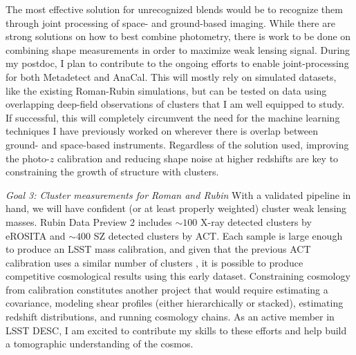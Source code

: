 \documentclass[11pt]{article}
\begin{document}
The most effective solution for unrecognized blends would be to recognize them through joint processing of space- and ground-based imaging.
While there are strong solutions on how to best combine photometry, there is work to be done on combining shape measurements in order to maximize weak lensing signal.
During my postdoc, I plan to contribute to the ongoing efforts to enable joint-processing for both Metadetect and AnaCal.
This will mostly rely on simulated datasets, like the existing Roman-Rubin simulations, but can be tested on data using overlapping deep-field observations of clusters that I am well equipped to study.
If successful, this will completely circumvent the need for the machine learning techniques I have previously worked on wherever there is overlap between ground- and space-based instruments.
Regardless of the solution used, improving the photo-$z$ calibration and reducing shape noise at higher redshifts are key to constraining the growth of structure with clusters.


\textit{Goal 3: Cluster measurements for Roman and Rubin}
With a validated pipeline in hand, we will have confident (or at least properly weighted) cluster weak lensing masses.
Rubin Data Preview 2 includes $\sim 100$ X-ray detected clusters by eROSITA and $\sim 400$ SZ detected clusters by ACT.
Each sample is large enough to produce an LSST mass calibration, and given that the previous ACT calibration uses a similar number of clusters \cite{act_tae}, it is possible to produce competitive cosmological results using this early dataset.
Constraining cosmology from calibration constitutes another project that would require estimating a covariance, modeling shear profiles (either hierarchically or stacked), estimating redshift distributions, and running cosmology chains.
As an active member in LSST DESC, I am excited to contribute my skills to these efforts and help build a tomographic understanding of the cosmos.
\end{document}
